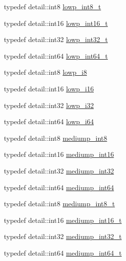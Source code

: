 \begin{DoxyCompactItemize}
typedef detail\+::int8 \hyperlink{group__gtc__type__precision_gae6092311f6970a305c2df19a372360a3}{lowp\+\_\+int8\+\_\+t}
\item 
typedef detail\+::int16 \hyperlink{group__gtc__type__precision_gae34c3d53c4c1434fc9f26538b0185667}{lowp\+\_\+int16\+\_\+t}
\item 
typedef detail\+::int32 \hyperlink{group__gtc__type__precision_gad9567c806dc39f534174eef42663119d}{lowp\+\_\+int32\+\_\+t}
\item 
typedef detail\+::int64 \hyperlink{group__gtc__type__precision_ga14d72e76d57c7f28eca8e933816c9fd6}{lowp\+\_\+int64\+\_\+t}
\item 
typedef detail\+::int8 \hyperlink{group__gtc__type__precision_gaa2e13ee29c90f75658beed6082541097}{lowp\+\_\+i8}
\item 
typedef detail\+::int16 \hyperlink{group__gtc__type__precision_gaf7bbfd31bcec25a416ea94d09efb5451}{lowp\+\_\+i16}
\item 
typedef detail\+::int32 \hyperlink{group__gtc__type__precision_ga70fd34e8b8cffc92739161284ed77328}{lowp\+\_\+i32}
\item 
typedef detail\+::int64 \hyperlink{group__gtc__type__precision_ga1f4ded25f71c0f3b4518936d50b54b6e}{lowp\+\_\+i64}
\item 
typedef detail\+::int8 \hyperlink{group__gtc__type__precision_ga3ee8faab2278c44c5785af04b7b18a14}{mediump\+\_\+int8}
\item 
typedef detail\+::int16 \hyperlink{group__gtc__type__precision_ga4611997edb6c61606daa11990cf08798}{mediump\+\_\+int16}
\item 
typedef detail\+::int32 \hyperlink{group__gtc__type__precision_ga0660a752402702f420f13c686a7fff29}{mediump\+\_\+int32}
\item 
typedef detail\+::int64 \hyperlink{group__gtc__type__precision_ga603c695fe5cd677d3f72a81343e19a74}{mediump\+\_\+int64}
\item 
typedef detail\+::int8 \hyperlink{group__gtc__type__precision_ga626ac5f73d3538e62a879d6c56abfb36}{mediump\+\_\+int8\+\_\+t}
\item 
typedef detail\+::int16 \hyperlink{group__gtc__type__precision_ga478fab608cf43040013d719a3e03b194}{mediump\+\_\+int16\+\_\+t}
\item 
typedef detail\+::int32 \hyperlink{group__gtc__type__precision_gafd9b4bd9e4465aec63351b59100692c4}{mediump\+\_\+int32\+\_\+t}
\item 
typedef detail\+::int64 \hyperlink{group__gtc__type__precision_ga555a2f85641550c232db473a9bb981f7}{mediump\+\_\+int64\+\_\+t}

\end{DoxyCompactItemize}
